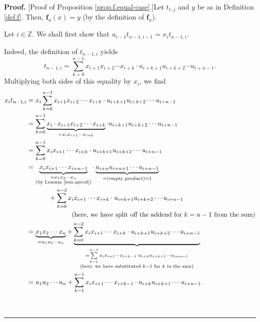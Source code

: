 \documentclass[numbers=enddot,12pt,final,onecolumn,notitlepage]{scrartcl}%
\theoremstyle{definition}
\newenvironment{proof}[1][Proof]{\noindent\textbf{#1.} }{\ \rule{0.5em}{0.5em}}
\let\sumnonlimits\sum
\renewcommand{\sum}{\sumnonlimits\limits}
\newenvironment{vershort}{}{}
\begin{document}
\begin{proof}
[Proof of Proposition \ref{prop.f.equal-case}.]Let $t_{r,j}$ and $y$ be as in
Definition \ref{def.f}. Then, $\mathbf{f}_{u}\left(  x\right)  =y$ (by the
definition of $\mathbf{f}_{u}$).

\begin{vershort}
Let $i\in\mathbb{Z}$. We shall first show that $u_{i-1}t_{n-1,i-1}%
=x_{i}t_{n-1,i}$.

Indeed, the definition of $t_{n-1,i}$ yields%
\[
t_{n-1,i}=\sum_{k=0}^{n-1}x_{i+1}x_{i+2}\cdots x_{i+k}\cdot u_{i+k+1}%
u_{i+k+2}\cdots u_{i+n-1}.
\]
Multiplying both sides of this equality by $x_{i}$, we find%
\begin{align}
x_{i}t_{n-1,i}  &  =x_{i}\sum_{k=0}^{n-1}x_{i+1}x_{i+2}\cdots x_{i+k}\cdot
u_{i+k+1}u_{i+k+2}\cdots u_{i+n-1}\nonumber\\
&  =\sum_{k=0}^{n-1}\underbrace{x_{i}\cdot x_{i+1}x_{i+2}\cdots x_{i+k}%
}_{=x_{i}x_{i+1}\cdots x_{i+k}}\cdot u_{i+k+1}u_{i+k+2}\cdots u_{i+n-1}%
\nonumber\\
&  =\sum_{k=0}^{n-1}x_{i}x_{i+1}\cdots x_{i+k}\cdot u_{i+k+1}u_{i+k+2}\cdots
u_{i+n-1}\nonumber\\
&  =\underbrace{x_{i}x_{i+1}\cdots x_{i+n-1}}_{\substack{=x_{1}x_{2}\cdots
x_{n}\\\text{(by Lemma \ref{lem.aprod})}}}\cdot\underbrace{u_{i+n}%
u_{i+n+1}\cdots u_{i+n-1}}_{=\left(  \text{empty product}\right)
=1}\nonumber\\
&  \ \ \ \ \ \ \ \ \ \ +\sum_{k=0}^{n-2}x_{i}x_{i+1}\cdots x_{i+k}\cdot
u_{i+k+1}u_{i+k+2}\cdots u_{i+n-1}\nonumber\\
&  \ \ \ \ \ \ \ \ \ \ \ \ \ \ \ \ \ \ \ \ \left(  \text{here, we have split
off the addend for }k=n-1\text{ from the sum}\right) \nonumber\\
&  =\underbrace{x_{1}x_{2}\cdots x_{n}}_{=u_{1}u_{2}\cdots u_{n}%
}+\underbrace{\sum_{k=0}^{n-2}x_{i}x_{i+1}\cdots x_{i+k}\cdot u_{i+k+1}%
u_{i+k+2}\cdots u_{i+n-1}}_{\substack{=\sum_{k=1}^{n-1}x_{i}x_{i+1}\cdots
x_{i+k-1}\cdot u_{i+k}u_{i+k+1}\cdots u_{i+n-1}\\\text{(here, we have
substituted }k-1\text{ for }k\text{ in the sum)}}}\nonumber\\
&  =u_{1}u_{2}\cdots u_{n}+\sum_{k=1}^{n-1}x_{i}x_{i+1}\cdots x_{i+k-1}\cdot
u_{i+k}u_{i+k+1}\cdots u_{i+n-1}. \label{pf.prop.f.equal-case.short.1}%
\end{align}



\end{vershort}
\end{proof}
\end{document}
